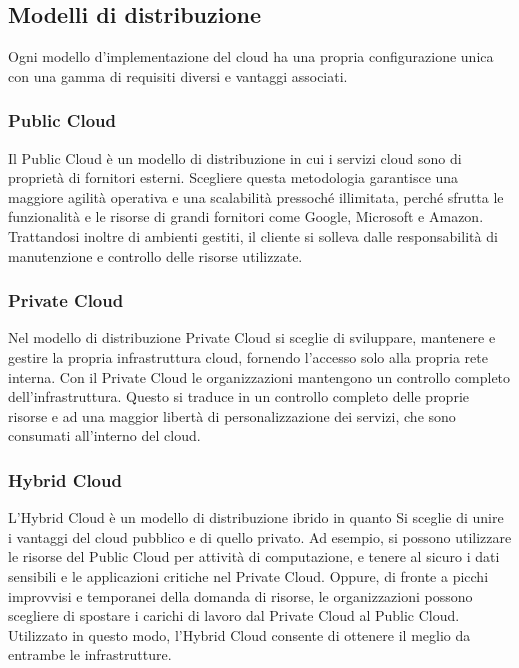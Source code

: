 \subsection{Modelli di distribuzione}
Ogni modello d'implementazione del cloud ha una propria configurazione unica con una gamma di requisiti diversi e vantaggi associati.

\subsubsection{Public Cloud}
Il Public Cloud è un modello di distribuzione in cui i servizi cloud sono di proprietà di fornitori esterni. Scegliere questa metodologia garantisce una maggiore agilità operativa e una scalabilità pressoché illimitata, perché sfrutta le funzionalità e le risorse di grandi fornitori come Google, Microsoft e Amazon.
Trattandosi inoltre di ambienti gestiti, il cliente si solleva dalle responsabilità di manutenzione e controllo delle risorse utilizzate.

\subsubsection{Private Cloud}
Nel modello di distribuzione Private Cloud si sceglie di sviluppare, mantenere e gestire la propria infrastruttura cloud, fornendo l'accesso solo alla propria rete interna. Con il Private Cloud le organizzazioni mantengono un controllo completo dell'infrastruttura. Questo si traduce in un controllo completo delle proprie risorse e ad una maggior libertà di personalizzazione dei servizi, che sono consumati all'interno del cloud.

\subsubsection{Hybrid Cloud}
L’Hybrid Cloud è un modello di distribuzione ibrido in quanto 
Si sceglie di unire i vantaggi del cloud pubblico e di quello privato.
Ad esempio, si possono utilizzare le risorse del Public Cloud per attività di computazione, e tenere al sicuro i dati sensibili e le applicazioni critiche nel Private Cloud. Oppure, di fronte a picchi improvvisi e temporanei della domanda di risorse, le organizzazioni possono scegliere di spostare i carichi di lavoro dal Private Cloud al Public Cloud.
Utilizzato in questo modo, l’Hybrid Cloud consente di ottenere il meglio da entrambe le infrastrutture.